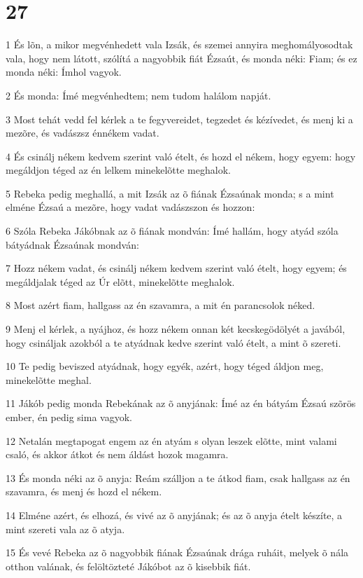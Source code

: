 \chapter{27}

\par 1 És lõn, a mikor megvénhedett vala Izsák, és szemei annyira meghomályosodtak vala, hogy nem látott, szólítá a nagyobbik fiát Ézsaút, és monda néki: Fiam; és ez monda néki: Ímhol vagyok.
\par 2 És monda: Ímé megvénhedtem; nem tudom halálom napját.
\par 3 Most tehát vedd fel kérlek a te fegyvereidet, tegzedet és kézívedet, és menj ki a mezõre, és vadászsz énnékem vadat.
\par 4 És csinálj nékem kedvem szerint való ételt, és hozd el nékem, hogy egyem: hogy megáldjon téged az én lelkem minekelõtte meghalok.
\par 5 Rebeka pedig meghallá, a mit Izsák az õ fiának Ézsaúnak monda; s a mint elméne Ézsaú a mezõre, hogy vadat vadászszon és hozzon:
\par 6 Szóla Rebeka Jákóbnak az õ fiának mondván: Ímé hallám, hogy atyád szóla bátyádnak Ézsaúnak mondván:
\par 7 Hozz nékem vadat, és csinálj nékem kedvem szerint való ételt, hogy egyem; és megáldjalak téged az Úr elõtt, minekelõtte meghalok.
\par 8 Most azért fiam, hallgass az én szavamra, a mit én parancsolok néked.
\par 9 Menj el kérlek, a nyájhoz, és hozz nékem onnan két kecskegödölyét a javából, hogy csináljak azokból a te atyádnak kedve szerint való ételt, a mint õ szereti.
\par 10 Te pedig beviszed atyádnak, hogy egyék, azért, hogy téged áldjon meg, minekelõtte meghal.
\par 11 Jákób pedig monda Rebekának az õ anyjának: Ímé az én bátyám Ézsaú szõrös ember, én pedig sima vagyok.
\par 12 Netalán megtapogat engem az én atyám s olyan leszek elõtte, mint valami csaló, és akkor átkot és nem áldást hozok magamra.
\par 13 És monda néki az õ anyja: Reám szálljon a te átkod fiam, csak hallgass az én szavamra, és menj és hozd el nékem.
\par 14 Elméne azért, és elhozá, és vivé az õ anyjának; és az õ anyja ételt készíte, a mint szereti vala az õ atyja.
\par 15 És vevé Rebeka az õ nagyobbik fiának Ézsaúnak drága ruháit, melyek õ nála otthon valának, és felöltözteté Jákóbot az õ kisebbik fiát.
